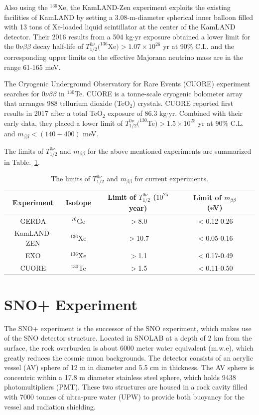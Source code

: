 \documentclass[preprint,12pt]{elsarticle}
\numberwithin{equation}{section}
\begin{document}
Also using the $^{136}$Xe, the KamLAND-Zen experiment exploits the existing facilities of KamLAND by setting a 3.08-m-diameter spherical inner balloon filled with 13 tons of Xe-loaded liquid scintillator at the center of the KamLAND detector. Their 2016 results from a 504 kg$\cdot$yr exposure obtained a lower limit for the $0\nu\beta\beta$ decay half-life of $T^{0\nu}_{1/2}(^{136}$Xe$)>1.07\times 10^{26}$ yr at 90\% C.L. and the corresponding upper limits on the effective Majorana neutrino mass are in the range 61-165 meV\cite{kamlandZen}.

The Cryogenic Underground Observatory for Rare Events (CUORE) experiment searches for $0\nu\beta\beta$ in $^{130}$Te. CUORE is a tonne-scale cryogenic bolometer array that arranges 988 tellurium dioxide (TeO$_2$) crystals. CUORE reported first results in 2017 after a total TeO$_2$ exposure of 86.3 kg$\cdot$yr. Combined with their early data, they placed a lower limit of $T^{0\nu}_{1/2}(^{130}$Te$)>1.5\times 10^{25}$ yr at 90\% C.L. and $m_{\beta\beta}<(140-400)$  meV\cite{cuore}.

The limits of $T^{0\nu}_{1/2}$ and $m_{\beta\beta}$ for the above mentioned experiments are summarized in Table.~\ref{gerdatable}\cite{gerda2018}.
\begin{table}[ht]
	\caption{\label{gerdatable} The limits of $T^{0\nu}_{1/2}$ and $m_{\beta\beta}$ for current experiments.}	
	{\centering
		\begin{tabular*}{135mm}{c@{\extracolsep{\fill}}cccc}
			\toprule 
			Experiment & Isotope & Limit of $T^{0\nu}_{1/2}$ ($10^{25}$ year) & Limit of $m_{\beta\beta}$ (eV)\\
			\midrule
			GERDA       & $^{76}$Ge & $>$8.0 & $<$0.12-0.26  \\	
			KamLAND-ZEN & $^{136}$Xe & $>$10.7 & $<$0.05-0.16	\\
			EXO         & $^{136}$Xe & $>$1.1 & $<$0.17-0.49  \\	
			CUORE       & $^{130}$Te & $>$1.5 &  $<$0.11-0.50 \\	
			\bottomrule	
		\end{tabular*}
	}
\end{table}

\section{SNO+ Experiment}
The SNO+ experiment is the successor of the SNO experiment, which makes use of the SNO detector structure. Located in SNOLAB at a depth of 2 km from the surface, the rock overburden is about 6000 meter water equivalent (m.w.e), which greatly reduces the cosmic muon backgrounds. The detector consists of an acrylic vessel (AV) sphere of 12 m in diameter and 5.5 cm in thickness. The AV sphere is concentric within a 17.8 m diameter stainless steel sphere, which holds 9438 photomultipliers (PMT). These two structures are housed in a rock cavity filled with 7000 tonnes of ultra-pure water (UPW) to provide both buoyancy for the vessel and radiation shielding\cite{whitepaper, erica}.
\end{document}
